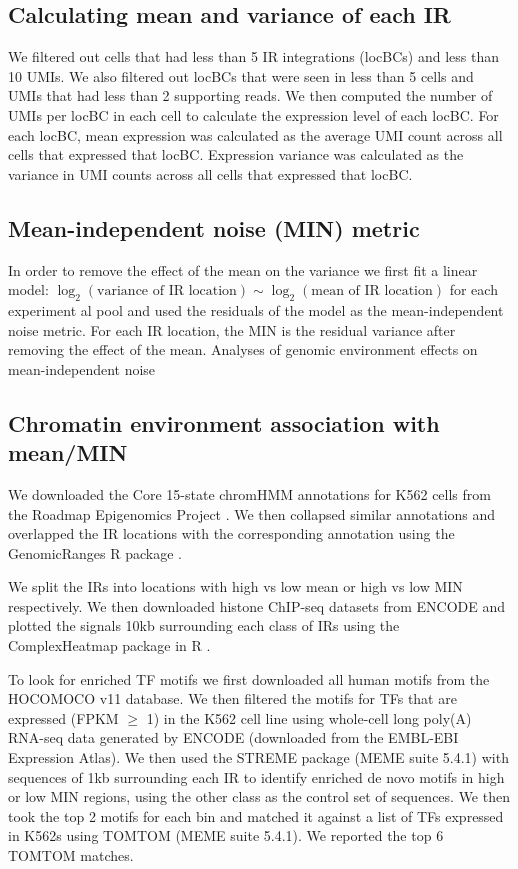 \subsection*{Calculating mean and variance of each IR}

We filtered out cells that had less than 5 IR integrations (locBCs) and less than 10 UMIs. We also filtered out locBCs that were seen in less than 5 cells and UMIs that had less than 2 supporting reads. We then computed the number of UMIs per locBC in each cell to calculate the expression level of each locBC. For each locBC, mean expression was calculated as the average UMI count across all cells that expressed that locBC. Expression variance was calculated as the variance in UMI counts across all cells that expressed that locBC. 

\subsection*{Mean-independent noise (MIN) metric}

In order to remove the effect of the mean on the variance we first fit a linear model: $\log_2(\text{variance of IR location}) \sim \log_2(\text{mean of IR location})$ for each experiment al pool and used the residuals of the model as the mean-independent noise metric. For each IR location, the MIN is the residual variance after removing the effect of the mean.
Analyses of genomic environment effects on mean-independent noise

\subsection*{Chromatin environment association with mean/MIN}

We downloaded the Core 15-state chromHMM annotations for K562 cells from the Roadmap Epigenomics Project \cite{kundajea_kellism:IntegrativeAnalysis2015}. We then collapsed similar annotations and overlapped the IR locations with the corresponding annotation using the GenomicRanges R package \cite{lawrencem_careyvj:SoftwareComputing2013}. 

We split the IRs into locations with high vs low mean or high vs low MIN respectively. We then downloaded histone ChIP-seq datasets from ENCODE \cite{mooreje_wengz:ExpandedEncyclopaedias2020} and plotted the signals 10kb surrounding each class of IRs using the ComplexHeatmap package in R \cite{guz_schlesnerm:ComplexHeatmaps2016}. 

To look for enriched TF motifs we first downloaded all human motifs from the HOCOMOCO v11 database. We then filtered the motifs for TFs that are expressed (FPKM $\geq$ 1) in the K562 cell line using whole-cell long poly(A) RNA-seq data generated by ENCODE (downloaded from the EMBL-EBI Expression Atlas). We then used the STREME package \cite{baileytl_baileytl:STREMEAccurate2021} (MEME suite 5.4.1) with sequences of 1kb surrounding each IR to identify enriched de novo motifs in high or low MIN regions, using the other class as the control set of sequences. We then took the top 2 motifs for each bin and matched it against a list of TFs expressed in K562s using TOMTOM \cite{guptas_noblews:QuantifyingSimilarity2007} (MEME suite 5.4.1). We reported the top 6 TOMTOM matches. 

